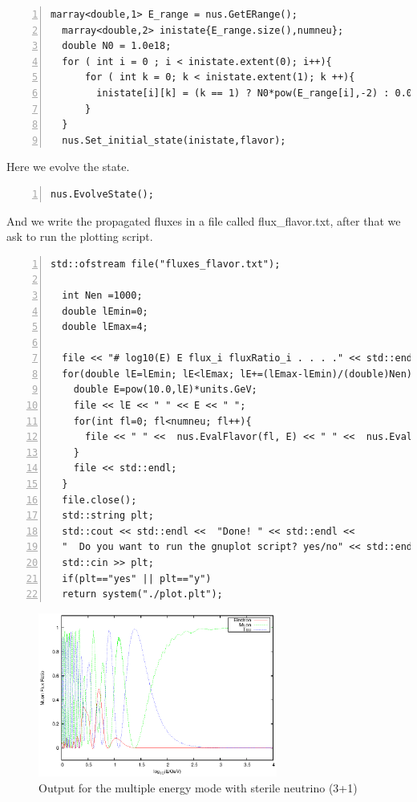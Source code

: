 \begin{lstlisting}[frame=leftline, numbers = left,breaklines=true,label = ex:sin1,firstnumber=last]
  marray<double,1> E_range = nus.GetERange();
  marray<double,2> inistate{E_range.size(),numneu};
  double N0 = 1.0e18;
  for ( int i = 0 ; i < inistate.extent(0); i++){
      for ( int k = 0; k < inistate.extent(1); k ++){
        inistate[i][k] = (k == 1) ? N0*pow(E_range[i],-2) : 0.0;
      }
  }
  nus.Set_initial_state(inistate,flavor);
\end{lstlisting}
Here we evolve the state.
\begin{lstlisting}[frame=leftline, numbers = left,breaklines=true,label = ex:sin1,firstnumber=last]
  nus.EvolveState();
\end{lstlisting}
And we write the propagated fluxes in a file called {\ttf
  flux\_flavor.txt}, after that we ask to run the plotting script.
\begin{lstlisting}[frame=leftline, numbers = left,breaklines=true,label = ex:sin1,firstnumber=last]
  std::ofstream file("fluxes_flavor.txt");
  
  int Nen =1000;
  double lEmin=0;
  double lEmax=4;
  
  file << "# log10(E) E flux_i fluxRatio_i . . . ." << std::endl;
  for(double lE=lEmin; lE<lEmax; lE+=(lEmax-lEmin)/(double)Nen){
    double E=pow(10.0,lE)*units.GeV;
    file << lE << " " << E << " ";
    for(int fl=0; fl<numneu; fl++){
      file << " " <<  nus.EvalFlavor(fl, E) << " " <<  nus.EvalFlavor(fl, E)/(N0*pow(E,-2));
    }
    file << std::endl;
  }
  file.close();
  std::string plt;
  std::cout << std::endl <<  "Done! " << std::endl <<
  "  Do you want to run the gnuplot script? yes/no" << std::endl;
  std::cin >> plt;
  if(plt=="yes" || plt=="y")
  return system("./plot.plt");
\end{lstlisting}


\begin{figure}[h!]
  \label{fig:multimode}
  \centering
  \includegraphics[width=0.7\textwidth]{fig/Multiplot.eps} 
  \caption{Output for the multiple energy mode with sterile neutrino (3+1)} 
\end{figure}
 
